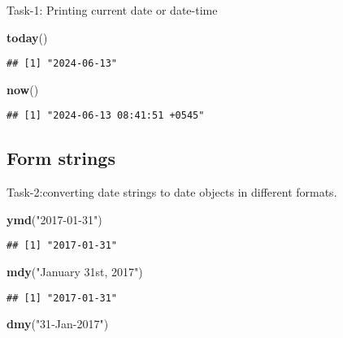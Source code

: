 \documentclass[
]{article}
\newenvironment{Shaded}{\begin{snugshade}}{\end{snugshade}}
\newcommand{\FunctionTok}[1]{\textcolor[rgb]{0.13,0.29,0.53}{\textbf{#1}}}
\newcommand{\NormalTok}[1]{#1}
\newcommand{\StringTok}[1]{\textcolor[rgb]{0.31,0.60,0.02}{#1}}
\begin{document}
Task-1: Printing current date or date-time

\begin{Shaded}
\begin{Highlighting}[]
\FunctionTok{today}\NormalTok{()}
\end{Highlighting}
\end{Shaded}

\begin{verbatim}
## [1] "2024-06-13"
\end{verbatim}

\begin{Shaded}
\begin{Highlighting}[]
\FunctionTok{now}\NormalTok{()}
\end{Highlighting}
\end{Shaded}

\begin{verbatim}
## [1] "2024-06-13 08:41:51 +0545"
\end{verbatim}

\hypertarget{form-strings}{%
\subsection{Form strings}\label{form-strings}}

Task-2:converting date strings to date objects in different formats.

\begin{Shaded}
\begin{Highlighting}[]
\FunctionTok{ymd}\NormalTok{(}\StringTok{"2017{-}01{-}31"}\NormalTok{)}
\end{Highlighting}
\end{Shaded}

\begin{verbatim}
## [1] "2017-01-31"
\end{verbatim}

\begin{Shaded}
\begin{Highlighting}[]
\FunctionTok{mdy}\NormalTok{(}\StringTok{"January 31st, 2017"}\NormalTok{)}
\end{Highlighting}
\end{Shaded}

\begin{verbatim}
## [1] "2017-01-31"
\end{verbatim}

\begin{Shaded}
\begin{Highlighting}[]
\FunctionTok{dmy}\NormalTok{(}\StringTok{"31{-}Jan{-}2017"}\NormalTok{)}
\end{Highlighting}
\end{Shaded}
\end{document}
